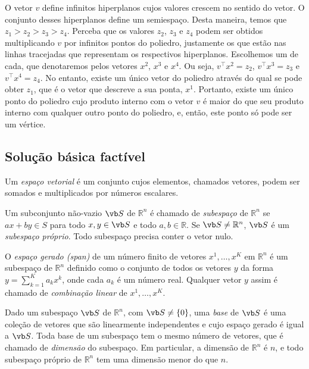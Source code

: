 O vetor $v$ define infinitos hiperplanos cujos valores crescem no sentido do vetor. O conjunto desses hiperplanos define um semiespaço. Desta maneira, temos que $z_1 > z_2 > z_3 > z_4$. Perceba que os valores $z_2$, $z_3$ e $z_4$ podem ser obtidos multiplicando $v$ por infinitos pontos do poliedro, justamente os que estão nas linhas tracejadas que representam os respectivos hiperplanos. Escolhemos um de cada, que denotaremos pelos vetores $x^2$, $x^3$ e $x^4$. Ou seja, $v^\intercal x^2 = z_2$, $v^\intercal x^3 = z_3$ e $v^\intercal x^4 = z_4$. No entanto, existe um único vetor do poliedro através do qual se pode obter $z_1$, que é o vetor que descreve a sua ponta, $x^1$. Portanto, existe um único ponto do poliedro cujo produto interno com o vetor $v$ é maior do que seu produto interno com qualquer outro ponto do poliedro, e, então, este ponto só pode ser um vértice.

\subsection{Solução básica factível}\label{sec:sbf}
\begin{mydef}
 Um \emph{espaço vetorial} é um conjunto cujos elementos, chamados vetores, podem ser somados e multiplicados por números escalares.
\end{mydef}

\begin{mydef}[Subespaço]
 Um subconjunto não-vazio $\vb S$ de $\mathbb{R}^n$ é chamado de \emph{subespaço} de $\mathbb{R}^n$ se $ax + by \in S$ para todo $x, y \in \vb S$ e todo $a, b \in \mathbb{R}$. Se $\vb S\neq\mathbb{R}^n$, $\vb S$ é um \emph{subespaço próprio}. Todo subespaço precisa conter o vetor nulo.
\end{mydef}

\begin{mydef}
 O \emph{espaço gerado (span)} de um número finito de vetores $x^1,\ldots,x^K$ em $\mathbb{R}^n$ é um subespaço de $\mathbb{R}^n$ definido como o conjunto de todos os vetores $y$ da forma $y=\sum^K_{k=1}a_kx^k$, onde cada $a_k$ é um número real. Qualquer vetor $y$ assim é chamado de \emph{combinação linear} de $x^1,\ldots,x^K$.
\end{mydef}

\begin{mydef}[Base]
 Dado um subespaço $\vb S$ de $\mathbb{R}^n$, com $\vb S\neq\{0\}$, uma \emph{base} de $\vb S$ é uma coleção de vetores que são linearmente independentes e cujo espaço gerado é igual a $\vb S$. Toda base de um subespaço tem o mesmo número de vetores, que é chamado de \emph{dimensão} do subespaço. Em particular, a dimensão de $\mathbb{R}^n$ é $n$, e todo subespaço próprio de $\mathbb{R}^n$ tem uma dimensão menor do que $n$.
\end{mydef}


